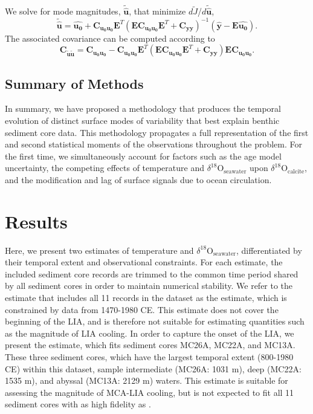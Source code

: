 \documentclass[draft]{agujournal2019}
\begin{document}
We solve for mode magnitudes, $\mathbf{\tilde{\hat{u}}}$, that minimize $d\tilde{J}$/$d\mathbf{\tilde{\hat{u}}}$, 
\begin{equation}
\mathbf{\tilde{\hat{u}}} = \mathbf{\hat{u_{0}}} + \mathbf{C_{u_{0}u_{0}}} \mathbf{E}^T\left(\mathbf{E}\mathbf{C_{u_{0}u_{0}}}\mathbf{E}^T + \mathbf{C_{yy}}\right)^{-1}\left(\mathbf{\hat{y}}-\mathbf{E\hat{u_0}}\right)
\label{eq:twls}.
\end{equation}
The associated covariance can be computed according to
\begin{equation}
\mathbf{C_{\tilde{u}\tilde{u}}} = \mathbf{C_{u_0u_0}}-\mathbf{C_{u_0u_0}}\mathbf{E}^T(\mathbf{E}\mathbf{C_{u_0u_0}}\mathbf{E}^T + \mathbf{C_{yy}}) \mathbf{E}\mathbf{C_{u_0u_0}}.
\label{eq:twlsCuu}
\end{equation}

\subsection{Summary of Methods \label{sec:som}}
In summary, we have proposed a methodology that produces the temporal
evolution of distinct surface modes of variability that best explain
benthic sediment core data. This methodology propagates a full
representation of the first and second statistical moments of the
observations throughout the problem. For the first time, we
simultaneously account for factors such as the age model uncertainty,
the competing effects of temperature and
$\delta^{18}\mathrm{O}_{\mathrm{seawater}}$ upon
$\delta^{18}\mathrm{O}_{\mathrm{calcite}}$, and the modification and lag of
surface signals due to ocean circulation.

\section{Results}
Here, we present two estimates of temperature and
$\delta^{18}\mathrm{O}_{\mathrm{seawater}}$, differentiated by their
temporal extent and observational constraints. For each estimate, the
included sediment core records are trimmed to the common time period
shared by all sediment cores in order to maintain numerical
stability. We refer to the estimate that includes all 11 records in
the  dataset as the 
estimate, which is constrained by data from 1470-1980 CE. This
estimate does not cover the beginning of the LIA, and is therefore not
suitable for estimating quantities such as the magnitude of LIA
cooling. In order to capture the onset of the LIA, we present the
 estimate, which fits sediment cores MC26A, MC22A, and
MC13A. These three sediment cores, which have the largest temporal
extent (800-1980 CE) within this dataset, sample intermediate (MC26A:
1031 m), deep (MC22A: 1535 m), and abyssal (MC13A: 2129 m)
waters. This estimate is suitable for assessing the magnitude of
MCA-LIA cooling, but is not expected to fit all 11 sediment cores with
as high fidelity as .
\end{document}
